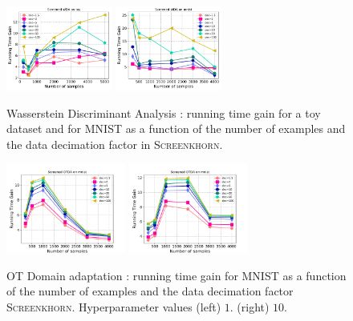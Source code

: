 \begin{figure}[t]
	\centering

	\includegraphics[width=0.31\textwidth]{./figs/wda_gain_toy.pdf}\hspace{1.5cm}
	\includegraphics[width=0.31\textwidth]{./figs/wda_gain_mnist.pdf}

	\caption{Wasserstein Discriminant Analysis : running time gain for a toy dataset and for MNIST as a function of the number of examples and the data decimation factor in \textsc{Screenkhorn}.}
	\label{fig:wda}
\end{figure}
\begin{figure}[t]
	\centering

	\includegraphics[width=0.35\textwidth]{./figs/da_gain_mnist_regcl1.pdf}\hspace{1cm}
	\includegraphics[width=0.35\textwidth]{./figs/da_gain_mnist_regcl10.pdf}
	\caption{OT Domain adaptation : running time gain  for MNIST as a function of the number of examples and the data decimation factor \textsc{Screenkhorn}. Hyperparameter values (left) $1$. (right) $10$.}
	\label{fig:otda}
\end{figure}

